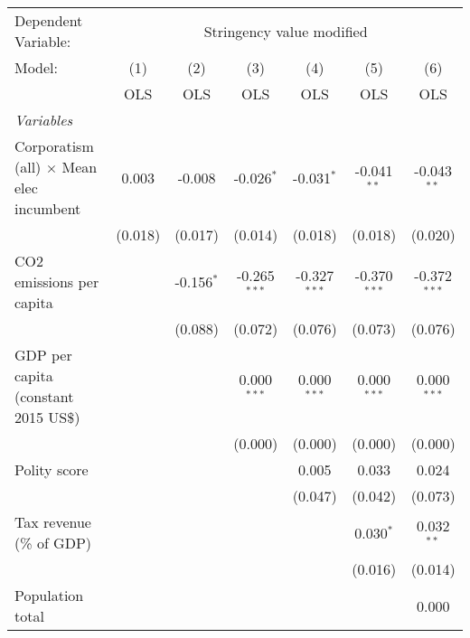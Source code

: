 
\begingroup
\centering
\begin{tabular}{lcccccc}
   \toprule
   Dependent Variable: & \multicolumn{6}{c}{Stringency value modified}\\
   Model:                                          & (1)     & (2)          & (3)            & (4)            & (5)            & (6)\\  
                                                   &  OLS    & OLS          & OLS            & OLS            & OLS            & OLS\\  
   \midrule
   \emph{Variables}\\
   Corporatism (all) $\times$ Mean elec incumbent  & 0.003   & -0.008       & -0.026$^{*}$   & -0.031$^{*}$   & -0.041$^{**}$  & -0.043$^{**}$\\   
                                                   & (0.018) & (0.017)      & (0.014)        & (0.018)        & (0.018)        & (0.020)\\   
   CO2 emissions per capita                        &         & -0.156$^{*}$ & -0.265$^{***}$ & -0.327$^{***}$ & -0.370$^{***}$ & -0.372$^{***}$\\   
                                                   &         & (0.088)      & (0.072)        & (0.076)        & (0.073)        & (0.076)\\   
   GDP per capita (constant 2015 US\$)             &         &              & 0.000$^{***}$  & 0.000$^{***}$  & 0.000$^{***}$  & 0.000$^{***}$\\   
                                                   &         &              & (0.000)        & (0.000)        & (0.000)        & (0.000)\\   
   Polity score                                    &         &              &                & 0.005          & 0.033          & 0.024\\   
                                                   &         &              &                & (0.047)        & (0.042)        & (0.073)\\   
   Tax revenue (\% of GDP)                         &         &              &                &                & 0.030$^{*}$    & 0.032$^{**}$\\   
                                                   &         &              &                &                & (0.016)        & (0.014)\\   
   Population total                                &         &              &                &                &                & 0.000\\   

\end{tabular}
